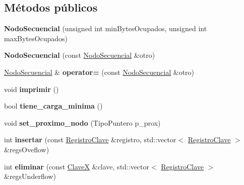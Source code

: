 \subsection*{\-Métodos públicos}
\begin{DoxyCompactItemize}
\item 
\hypertarget{class_nodo_secuencial_a106273bd88d662f3c9addd3366f88b3f}{{\bfseries \-Nodo\-Secuencial} (unsigned int min\-Bytes\-Ocupados, unsigned int max\-Bytes\-Ocupados)}\label{class_nodo_secuencial_a106273bd88d662f3c9addd3366f88b3f}

\item 
\hypertarget{class_nodo_secuencial_aa9ac47b8ce085738d7772694e076653d}{{\bfseries \-Nodo\-Secuencial} (const \hyperlink{class_nodo_secuencial}{\-Nodo\-Secuencial} \&otro)}\label{class_nodo_secuencial_aa9ac47b8ce085738d7772694e076653d}

\item 
\hypertarget{class_nodo_secuencial_a5dba3a824a9c4912c00ed2c08edcdd7c}{\hyperlink{class_nodo_secuencial}{\-Nodo\-Secuencial} \& {\bfseries operator=} (const \hyperlink{class_nodo_secuencial}{\-Nodo\-Secuencial} \&otro)}\label{class_nodo_secuencial_a5dba3a824a9c4912c00ed2c08edcdd7c}

\item 
\hypertarget{class_nodo_secuencial_a778573de969cbd29e3b9c5321f66e09d}{void {\bfseries imprimir} ()}\label{class_nodo_secuencial_a778573de969cbd29e3b9c5321f66e09d}

\item 
\hypertarget{class_nodo_secuencial_ad4087807bea589ede7b779c3cab551c3}{bool {\bfseries tiene\-\_\-carga\-\_\-minima} ()}\label{class_nodo_secuencial_ad4087807bea589ede7b779c3cab551c3}

\item 
\hypertarget{class_nodo_secuencial_aa41f85df74de1160902bf2325bc574e7}{void {\bfseries set\-\_\-proximo\-\_\-nodo} (\-Tipo\-Puntero p\-\_\-prox)}\label{class_nodo_secuencial_aa41f85df74de1160902bf2325bc574e7}

\item 
\hypertarget{class_nodo_secuencial_a13f3746e2dceefb2c45868a3f09f6f8a}{int {\bfseries insertar} (const \hyperlink{class_registro_clave}{\-Registro\-Clave} \&registro, std\-::vector$<$ \hyperlink{class_registro_clave}{\-Registro\-Clave} $>$ \&regs\-Oveflow)}\label{class_nodo_secuencial_a13f3746e2dceefb2c45868a3f09f6f8a}

\item 
\hypertarget{class_nodo_secuencial_a7d4462178d22906cb72f7ca3cdc4520c}{int {\bfseries eliminar} (const \hyperlink{class_clave_x}{\-Clave\-X} \&clave, std\-::vector$<$ \hyperlink{class_registro_clave}{\-Registro\-Clave} $>$ \&regs\-Underflow)}\label{class_nodo_secuencial_a7d4462178d22906cb72f7ca3cdc4520c}


\end{DoxyCompactItemize}
